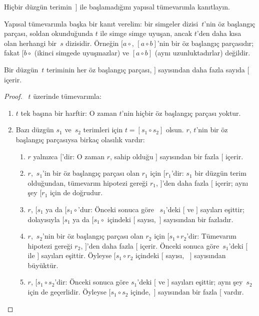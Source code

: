 \documentclass[../../../include/open-logic-section]{subfiles}
\begin{document}
\begin{prob}
  Hiçbir düzgün terimin~$]$ ile başlamadığını yapısal tümevarımla
  kanıtlayın.
\end{prob}

Yapısal tümevarımla başka bir kanıt verelim: bir simgeler dizisi~$t$'nin
öz başlangıç parçası, soldan okunduğunda $t$ ile simge simge uyuşan,
ancak $t$'den daha kısa olan herhangi bir~$s$ dizisidir. Örneğin $[a
\circ {}$, $[a \circ b]$'nin bir öz başlangıç parçasıdır; fakat $[b
\circ {}$ (ikinci simgede uyuşmazlar) ve $[a \circ b]$ (aynı
uzunluktadırlar) değildir.

\begin{prop}
  Bir düzgün~$t$ teriminin her öz başlangıç parçası, $]$ sayısından
  daha fazla sayıda $[$ içerir.
\end{prop}

\begin{proof}
  ~$t$ üzerinde tümevarımla:
  \begin{enumerate}
  \item $t$ tek başına bir harftir: O zaman $t$'nin hiçbir öz başlangıç
    parçası yoktur.
  \item Bazı düzgün $s_1$ ve~$s_2$ terimleri için $t = [s_1 \circ
    s_2]$ olsun. $r$, $t$'nin bir öz başlangıç parçasıysa birkaç olasılık
    vardır:
    \begin{enumerate}
    \item $r$ yalnızca $[$'dir: O zaman $r$, sahip olduğu $]$ sayısından
      bir fazla $[$ içerir.
    \item $r$,~$s_1$'in bir öz başlangıç parçası olan $r_1$ için
      $[r_1$'dir: $s_1$ bir düzgün terim olduğundan, tümevarım hipotezi
      gereği $r_1$, $]$'den daha fazla $[$ içerir; aynı şey $[r_1$ için
      de doğrudur.
    \item $r$, $[s_1$ ya da $[s_1 \circ {}$'dur: Önceki sonuca göre
      ~$s_1$'deki $[$ ve $]$ sayıları eşittir; dolayısıyla $[s_1$ ya da
      $[s_1 \circ {}$ içindeki $[$ sayısı,~$]$ sayısından bir fazladır.
    \item $r$,~$s_2$'nin bir öz başlangıç parçası olan $r_2$ için
      $[s_1 \circ r_2$'dir: Tümevarım hipotezi gereği $r_2$, $]$'den daha
      fazla $[$ içerir. Önceki sonuca göre~$s_1$'deki $[$ ile $]$
      sayıları eşittir. Öyleyse $[s_1 \circ r_2$ içindeki $[$ sayısı,
      ~$]$ sayısından büyüktür.
    \item $r$, $[s_1 \circ s_2$'dir: Önceki sonuca göre $s_1$'deki $[$
      ve $]$ sayıları eşittir; aynı şey~$s_2$ için de geçerlidir. Öyleyse
      $[s_1 \circ s_2$ içinde,~$]$ sayısından bir fazla $[$ vardır.
    \end{enumerate}
  \end{enumerate}
\end{proof}
\end{document}

